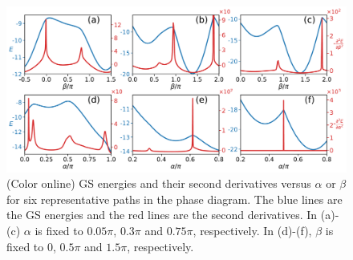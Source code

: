 \documentclass[aps,prb,reprint,amsfonts,amsmath,amssymb,showpacs,groupedaddress,superscriptaddress]{revtex4-1}
\begin{document}
\begin{figure}
    \centering
    \includegraphics[width=\columnwidth]{SecondDerivatives46.pdf}
    \caption{\label{fig:SecondDerivatives46} (Color online) GS energies and their second derivatives versus $\alpha$ or $\beta$ for six representative paths in the phase diagram.  The blue lines are the GS energies and the red lines are the second derivatives. In (a)-(c) $\alpha$ is fixed to $0.05\pi$, $0.3\pi$ and $0.75\pi$, respectively. In (d)-(f), $\beta$ is fixed to $0$, $0.5\pi$ and $1.5\pi$, respectively.}
\end{figure}
\end{document}
